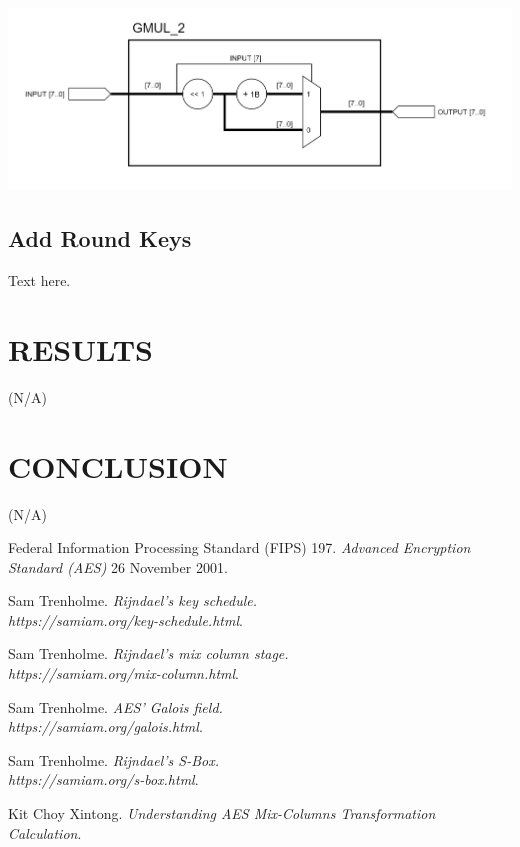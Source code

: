 \documentclass[a4paper, 10pt]{article}
\newenvironment{Figure}
    {\par\medskip\noindent\minipage{\linewidth}}
    {\endminipage\par\medskip}
\begin{document}
\begin{multicols}{2}
            \noindent
            \begin{Figure}
                \centering
                \includegraphics[width=\linewidth]{gmul_2.png}
                \label{fig:gmul-2}
            \end{Figure}

            \subsection{Add Round Keys}

            Text here.

        \section{RESULTS}

        (N/A)

        \section{CONCLUSION}

        (N/A)

        \begin{thebibliography}{3}
            Federal Information Processing Standard (FIPS) 197.
            \textit{Advanced Encryption Standard (AES)}
            26 November 2001.

            Sam Trenholme.
            \textit{Rijndael's key schedule.\\https://samiam.org/key-schedule.html}.

            Sam Trenholme.
            \textit{Rijndael's mix column stage.\\https://samiam.org/mix-column.html}.

            Sam Trenholme.
            \textit{AES' Galois field.\\https://samiam.org/galois.html}.

            Sam Trenholme.
            \textit{Rijndael's S-Box.\\https://samiam.org/s-box.html}.

            Kit Choy Xintong.
            \textit{Understanding AES Mix-Columns Transformation Calculation}.
        \end{thebibliography}

    \end{multicols}
\end{document}
